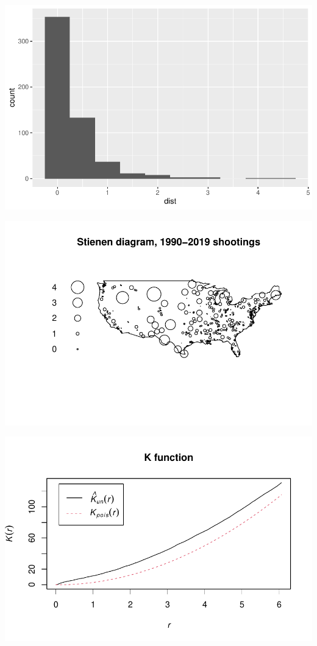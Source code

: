 \documentclass[12pt]{article}
\begin{document}
\includegraphics{JStevenRaquel_STATS295_Final_files/figure-latex/nearest-neighbor-1.pdf}

\includegraphics{JStevenRaquel_STATS295_Final_files/figure-latex/Sienen-diagram-1.pdf}

\includegraphics{JStevenRaquel_STATS295_Final_files/figure-latex/K-function-1.pdf}
\end{document}
